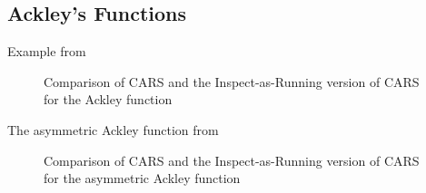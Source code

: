 \documentclass[sn-mathphys,Numbered]{sn-jnl}
\theoremstyle{thmstyleone}
\theoremstyle{thmstyletwo}
\theoremstyle{thmstylethree}
\begin{document}
\subsection{Ackley's Functions}
Example from \cite{chen2019run}
\begin{figure}
    \centering
    \caption{Comparison of CARS and the Inspect-as-Running version of CARS for the Ackley function}
    \label{fig: Ackley}
\end{figure}

The asymmetric Ackley function from \cite{chen2019run}
\begin{figure}
    \centering
    \caption{Comparison of CARS and the Inspect-as-Running version of CARS for the asymmetric Ackley function}
    \label{fig: Ackley asymmetric}
\end{figure}
\end{document}

